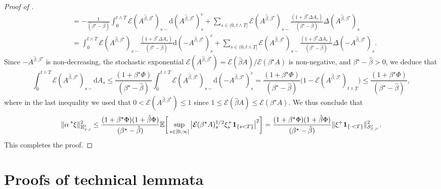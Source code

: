 \documentclass[10pt]{article} %
\newcommand\cE{\mathcal E}
\newcommand\cS{\mathcal S}
\newcommand{\smalltext}[1]{\text{\fontsize{4}{4}\selectfont$#1$}}
\def \E{\mathbb{E}}
\def \H{\mathbb{H}}
\newcommand{\brs}[1]{\prescript{\ast}{}{#1}}
\def\d{\mathrm{d}}
\begin{document}
\begin{proof}[Proof of ]
\begin{align*}
		&= -\frac{1}{(\beta^\star-\hat\beta)}\int_0^{t \land T}\cE(A^{\hat\beta,\beta^\star})_{s-}\d (A^{\hat\beta,\beta^\star})^c_s + \sum_{s \in (0,t \land T]}\cE(A^{\hat\beta,\beta^\star})_{s-} \frac{(1+\beta^\star \Delta A_s)}{(\beta^\star-\hat\beta)} \Delta (A^{\hat\beta,\beta^\star})_s \\
		&= \int_0^{t \land T}\cE(A^{\hat\beta,\beta^\star})_{s-}\frac{(1+\beta^\star\Delta A_s)}{(\beta^\star-\hat\beta)}\d (-A^{\hat\beta,\beta^\star})^c_s + \sum_{s \in (0,t \land T]}\cE(A^{\hat\beta,\beta^\star})_{s-} \frac{(1+\beta^\star \Delta A_s)}{(\beta^\star-\hat\beta)} \Delta (-A^{\hat\beta,\beta^\star})_s.
	\end{align*}
	Since $-A^{\hat\beta,\beta^\star}$ is non-decreasing, the stochastic exponential $\cE(A^{\hat\beta,\beta^\star}) = \cE(\hat\beta A)/\cE(\beta^\star A)$ is non-negative, and $\beta^\star - \hat\beta > 0$, we deduce that
	\begin{equation*}
		\int_0^{t \land T}\cE(A^{\hat\beta,\beta^\star})_{s-}\d A_s \leq \frac{(1+\beta^\star \Phi)}{(\beta^\star-\hat\beta)} \int_0^{t \land T} \cE(A^{\hat\beta,\beta^\star})_{s-}\d (-A^{\hat\beta,\beta^\star})^c_s = \frac{(1+\beta^\star \Phi)}{(\beta^\star-\hat\beta)} \bigg(1- \cE(A^{\hat\beta,\beta^\star})_{t \land T}\bigg) \leq \frac{(1+\beta^\star \Phi)}{(\beta^\star-\hat\beta)},
	\end{equation*}
	where in the last inequality we used that $0 < \cE(A^{\hat\beta,\beta^\star}) \leq 1$ since $1 \leq \cE(\hat\beta A) \leq \cE(\beta^\star A)$. We thus conclude that
	\begin{equation*}
		\|\alpha \brs{\xi}\|_{\H^\smalltext{2}_{\smalltext{T}\smalltext{,}\smalltext{\hat\beta}}}^2 
		\leq \frac{(1+\beta^\star \Phi)(1+\hat\beta \Phi)}{(\beta^\star-\hat\beta)}\E\bigg[\sup_{s \in [0,\infty]}\big|\cE(\beta^\star A)^{1/2}_s\xi^+_s\mathbf{1}_{\{s < T\}}\big|^2\bigg] 
		= \frac{(1+\beta^\star \Phi)(1+\hat\beta \Phi)}{(\beta^\star-\hat\beta)}\|\xi^+_\cdot \mathbf{1}_{\{\cdot < T\}}\|^2_{\cS^\smalltext{2}_{\smalltext{T}\smalltext{,}\smalltext{\beta^\star}}}.
	\end{equation*}
	This completes the proof.
\end{proof}

\section{Proofs of technical lemmata}\label{app::proofs_sec_main_results}\label{sec::optimal_stopping_proofs_technical}
\end{document}
